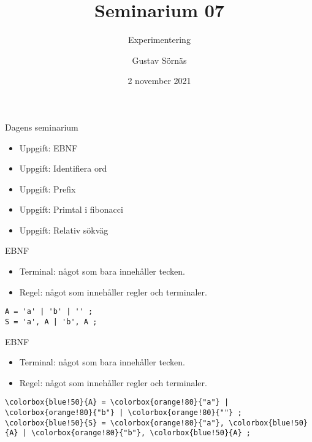 \documentclass{beamer}
\title{Seminarium 07}
\subtitle{Experimentering}
\date{2 november 2021}
\author{Gustav Sörnäs}
\begin{document}
  \frame{\titlepage}

  \begin{frame}{Dagens seminarium}

    \begin{itemize}
      \item Uppgift: EBNF
      \item Uppgift: Identifiera ord
      \item Uppgift: Prefix
      \item Uppgift: Primtal i fibonacci
      \item Uppgift: Relativ sökväg
    \end{itemize}

  \end{frame}

  \begin{frame}[fragile]{EBNF}
    \begin{itemize}
      \item Terminal: något som bara innehåller tecken.
      \item Regel: något som innehåller regler och terminaler.
    \end{itemize}

    \begin{Verbatim}[commandchars=\\\{\}]
A = 'a' | 'b' | '' ;
S = 'a', A | 'b', A ;
    \end{Verbatim}
  \end{frame}

  \begin{frame}[fragile]{EBNF}
    \begin{itemize}
      \item \colorbox{orange!80}{Terminal}: något som bara innehåller tecken.
      \item \colorbox{blue!50}{Regel}: något som innehåller regler och terminaler.
    \end{itemize}

    \begin{Verbatim}[commandchars=\\\{\}]
\colorbox{blue!50}{A} = \colorbox{orange!80}{"a"} | \colorbox{orange!80}{"b"} | \colorbox{orange!80}{""} ;
\colorbox{blue!50}{S} = \colorbox{orange!80}{"a"}, \colorbox{blue!50}{A} | \colorbox{orange!80}{"b"}, \colorbox{blue!50}{A} ;
    \end{Verbatim}
  \end{frame}
\end{document}
